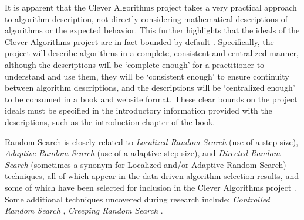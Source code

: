 \documentclass[a4paper, 11pt]{article}
\begin{document}
It is apparent that the Clever Algorithms project takes a very practical approach to algorithm description, not directly considering mathematical descriptions of algorithms or the expected behavior.  
This further highlights that the ideals of the Clever Algorithms project are in fact bounded by default \cite{Brownlee2010}. Specifically, the project will describe algorithms in a complete, consistent and centralized manner, although the descriptions will be `complete enough' for a practitioner to understand and use them, they will be `consistent enough' to ensure continuity between algorithm descriptions, and the descriptions will be `centralized enough' to be consumed in a book and website format. These clear bounds on the project ideals must be specified in the introductory information provided with the descriptions, such as the introduction chapter of the book.

Random Search is closely related to \emph{Localized Random Search} (use of a step size), \emph{Adaptive Random Search} (use of a adaptive step size), and \emph{Directed Random Search} (sometimes a synonym for Localized and/or Adaptive Random Search) techniques, all of which appear in the data-driven algorithm selection results, and some of which have been selected for inclusion in the Clever Algorithms project \cite{Brownlee2010b}.
Some additional techniques uncovered during research include: \emph{Controlled Random Search} \cite{Price1977}, \emph{Creeping Random Search} \cite{Rastrigin1963}.



\end{document}
